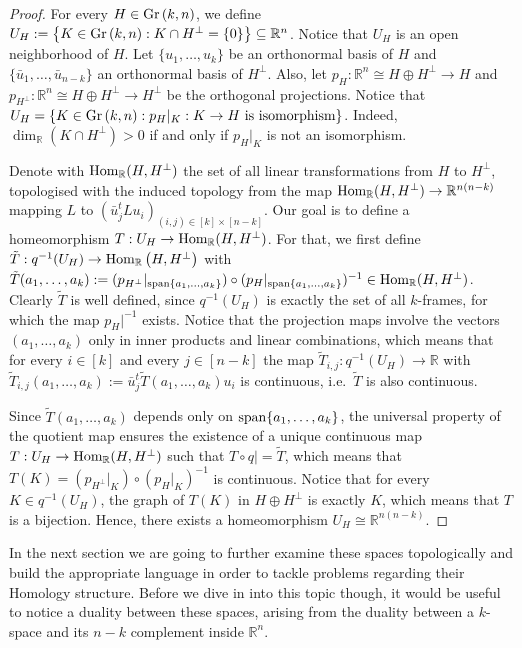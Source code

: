 \begin{proof} For every $H\in\Gr{k}{n}$, we define $U_H:=\left\{K\in\Gr{k}{n}:K\cap H^{\perp}=\{0\}\right\}\subseteq\mathbb{R}^n$. Notice that $U_H$ is an open neighborhood of $H$. Let $\{u_1,\ldots,u_k\}$ be an orthonormal basis of $H$ and $\{\bar{u}_1,\ldots,\bar{u}_{n-k}\}$ an orthonormal basis of $H^{\perp}$. Also, let $p_H:\mathbb{R}^n\cong H\oplus H^{\perp}\to H$ and $p_{H^{\perp}}:\mathbb{R}^n\cong H\oplus H^{\perp}\to H^{\perp}$ be the orthogonal projections. Notice that $U_H=\left\{K\in\Gr{k}{n}:p_H|_K:K\to H\text{ is isomorphism}\right\}$. Indeed, $\dim_{\mathbb{R}}(K\cap H^{\perp})>0$ if and only if $p_H|_K$ is not an isomorphism.

Denote with $\mathrm{Hom}_{\mathbb{R}}(H,H^{\perp})$ the set of all linear transformations from $H$ to $H^{\perp}$, topologised with the induced topology from the map $\mathrm{Hom}_{\mathbb{R}}(H,H^{\perp})\to\mathbb{R}^{n(n-k)}$ mapping $L$ to $(\bar{u}_j^tLu_i)_{(i,j)\in[k]\times[n-k]}$. Our goal is to define a homeomorphism $T:U_H\to\mathrm{Hom}_{\mathbb{R}}(H,H^{\perp})$. For that, we first define $\tilde{T}:q^{-1}(U_H)\to\mathrm{Hom}_{\mathbb{R}}\left(H,H^{\perp}\right)$ with $\tilde{T}(a_1,\ldots,a_k):=(p_{H^{\perp}}|_{\mathrm{span}\{a_1,\ldots,a_k\}})\circ(p_H|_{\mathrm{span}\{a_1,\ldots,a_k\}})^{-1}\in\mathrm{Hom}_{\mathbb{R}}(H,H^{\perp})$. Clearly $\tilde T$ is well defined, since $q^{-1}(U_H)$ is exactly the set of all $k$-frames, for which the map $p_H|^{-1}$ exists. Notice that the projection maps involve the vectors $(a_1,\ldots,a_k)$ only in inner products and linear combinations, which means that for every $i\in[k]$ and every $j\in[n-k]$ the map $\tilde{T}_{i,j}:q^{-1}(U_H)\to\mathbb{R}$ with $\tilde{T}_{i,j}(a_1,\ldots,a_k):=\bar{u}_j^t\tilde{T}(a_1,\ldots,a_k)u_i$ is continuous, i.e.\ $\tilde{T}$ is also continuous.

Since $\tilde{T}(a_1,\ldots,a_k)$ depends only on $\mathrm{span}\{a_1,\ldots,a_k\}$, the universal property of the quotient map ensures the existence of a unique continuous map $T:U_H\to\mathrm{Hom}_{\mathbb{R}}(H,H^{\perp})$ such that $T\circ q|=\tilde T$, which means that $T(K)=(p_{H^{\perp}}|_K)\circ{(p_H|_K)}^{-1}$ is continuous. Notice that for every $K\in q^{-1}(U_H)$, the graph of $T(K)$ in $H\oplus H^{\perp}$ is exactly $K$, which means that $T$ is a bijection. Hence, there exists a homeomorphism $U_H\cong\mathbb{R}^{n(n-k)}$.
\end{proof}
In the next section we are going to further examine these spaces topologically and build the appropriate language in order to tackle problems regarding their Homology structure. Before we dive in into this topic though, it would be useful to notice a duality between these spaces, arising from the duality between a $k$-space and its $n-k$ complement inside $\mathbb{R}^n$.

